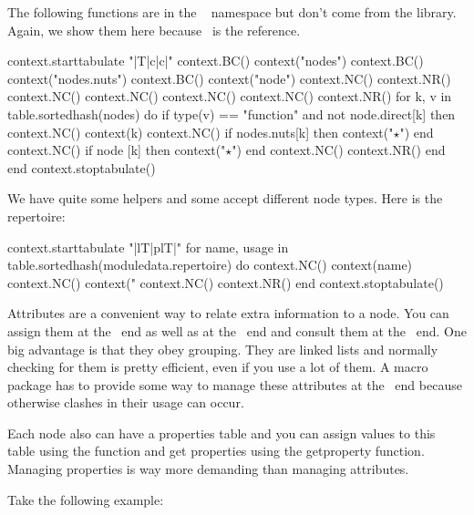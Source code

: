 The following functions are in the \CONTEXT\  namespace but don't
come from the library. Again, we show them here because \CONTEXT\ is the
reference.

\starttworows
\startluacode
    context.starttabulate { "|T|c|c|" }
        context.BC() context("nodes")
        context.BC() context("nodes.nuts")
        context.BC() context("node")
        context.NC() context.NR()
        context.NC()
        context.NC()
        context.NC()
        context.NC() context.NR()
        for k, v in table.sortedhash(nodes) do
            if type(v) == "function" and not node.direct[k] then
                context.NC() context(k)
                context.NC() if nodes.nuts[k] then context("$⋆$") end
                context.NC() if node      [k] then context("$⋆$") end
                context.NC() context.NR()
            end
        end
    context.stoptabulate()
\stopluacode
\stoptworows

We have quite some helpers and some accept different node types. Here is the
repertoire:

\startluacode
    context.starttabulate { "|lT|plT|" }
    for name, usage in table.sortedhash(moduledata.repertoire) do
        context.NC() context(name)
        context.NC() context("%
        context.NC() context.NR()
    end
    context.stoptabulate()
\stopluacode

\stopsubsection

\startsubsection[title={Properties}]

Attributes are a convenient way to relate extra information to a node. You can
assign them at the \TEX\ end as well as at the \LUA\ end and consult them at the
\LUA\ end. One big advantage is that they obey grouping. They are linked lists
and normally checking for them is pretty efficient, even if you use a lot of
them. A macro package has to provide some way to manage these attributes at the
\TEX\ end because otherwise clashes in their usage can occur.

Each node also can have a properties table and you can assign values to this
table using the  function and get properties using the \type
{getproperty} function. Managing properties is way more demanding than managing
attributes.

Take the following example:

\starttyping
{}
\stoptyping

